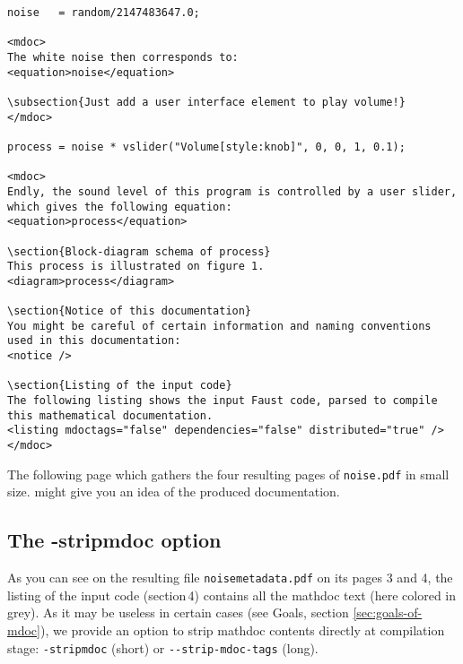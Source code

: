\begin{lstlisting}
noise   = random/2147483647.0;

<mdoc>
The white noise then corresponds to:
<equation>noise</equation>

\subsection{Just add a user interface element to play volume!}
</mdoc>

process = noise * vslider("Volume[style:knob]", 0, 0, 1, 0.1);

<mdoc>
Endly, the sound level of this program is controlled by a user slider, which gives the following equation: 
<equation>process</equation>

\section{Block-diagram schema of process}
This process is illustrated on figure 1.
<diagram>process</diagram>

\section{Notice of this documentation}
You might be careful of certain information and naming conventions used in this documentation:
<notice />

\section{Listing of the input code}
The following listing shows the input Faust code, parsed to compile this mathematical documentation.
<listing mdoctags="false" dependencies="false" distributed="true" />
</mdoc>
\end{lstlisting}
\normalsize

The following page which gathers the four resulting pages of \lstinline!noise.pdf! in small size. might give you an idea of the produced documentation.


\subsection{The -stripmdoc option}
\label{sec:striping-option}

As you can see on the resulting file \lstinline!noisemetadata.pdf! on its pages 3 and 4, the listing of the input code (section\,4) contains all the mathdoc text (here colored in grey). As it may be useless in certain cases (see Goals, section \ref{sec:goals-of-mdoc}), we provide an option to strip mathdoc contents directly at compilation stage: \lstinline!-stripmdoc! (short) or \lstinline!--strip-mdoc-tags! (long).



